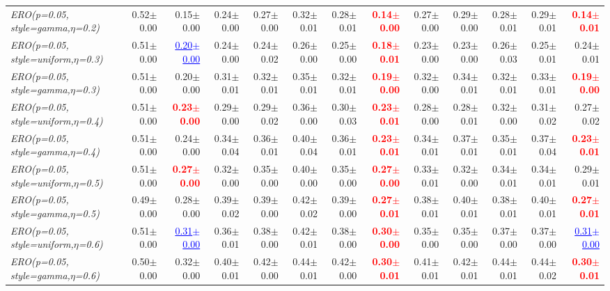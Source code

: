 \documentclass[nohyperref]{article}
\theoremstyle{plain}
\theoremstyle{definition}
\theoremstyle{remark}
\newcommand{\red}[1]{\textcolor{red}{\textbf{#1}}}
\newcommand{\blue}[1]{\textcolor{blue}{\underline{#1}}}
\begin{document}
\begin{table*}[!ht]
{\begin{tabular}{lrr|rrrrr|rrrrr}
			{\it ERO(p=0.05, style=gamma,$\eta$=0.2)} & 0.52$\pm$0.00 & 0.15$\pm$0.00 & 0.24$\pm$0.00 & 0.27$\pm$0.00 & 0.32$\pm$0.01 & 0.28$\pm$0.01 & \red{0.14$\pm$0.00} & 0.27$\pm$0.00 & 0.29$\pm$0.00 & 0.28$\pm$0.01 & 0.29$\pm$0.01 & \red{0.14$\pm$0.01} \\
			{\it ERO(p=0.05, style=uniform,$\eta$=0.3)} & 0.51$\pm$0.00 & \blue{0.20$\pm$0.00} & 0.24$\pm$0.00 & 0.24$\pm$0.02 & 0.26$\pm$0.00 & 0.25$\pm$0.00 & \red{0.18$\pm$0.01} & 0.23$\pm$0.00 & 0.23$\pm$0.00 & 0.26$\pm$0.03 & 0.25$\pm$0.01 & 0.24$\pm$0.01 \\
			{\it ERO(p=0.05, style=gamma,$\eta$=0.3)} & 0.51$\pm$0.00 & 0.20$\pm$0.00 & 0.31$\pm$0.01 & 0.32$\pm$0.01 & 0.35$\pm$0.01 & 0.32$\pm$0.01 & \red{0.19$\pm$0.00} & 0.32$\pm$0.00 & 0.34$\pm$0.01 & 0.32$\pm$0.01 & 0.33$\pm$0.01 & \red{0.19$\pm$0.00} \\
			{\it ERO(p=0.05, style=uniform,$\eta$=0.4)} & 0.51$\pm$0.00 & \red{0.23$\pm$0.00} & 0.29$\pm$0.00 & 0.29$\pm$0.02 & 0.36$\pm$0.00 & 0.30$\pm$0.03 & \red{0.23$\pm$0.01} & 0.28$\pm$0.00 & 0.28$\pm$0.01 & 0.32$\pm$0.00 & 0.31$\pm$0.02 & 0.27$\pm$0.02 \\
			{\it ERO(p=0.05, style=gamma,$\eta$=0.4)} & 0.51$\pm$0.00 & 0.24$\pm$0.00 & 0.34$\pm$0.04 & 0.36$\pm$0.01 & 0.40$\pm$0.04 & 0.36$\pm$0.01 & \red{0.23$\pm$0.01} & 0.34$\pm$0.01 & 0.37$\pm$0.01 & 0.35$\pm$0.01 & 0.37$\pm$0.04 & \red{0.23$\pm$0.01} \\
			{\it ERO(p=0.05, style=uniform,$\eta$=0.5)} & 0.51$\pm$0.00 & \red{0.27$\pm$0.00} & 0.32$\pm$0.00 & 0.35$\pm$0.00 & 0.40$\pm$0.00 & 0.35$\pm$0.00 & \red{0.27$\pm$0.00} & 0.33$\pm$0.01 & 0.32$\pm$0.00 & 0.34$\pm$0.01 & 0.34$\pm$0.01 & 0.29$\pm$0.01 \\
			{\it ERO(p=0.05, style=gamma,$\eta$=0.5)} & 0.49$\pm$0.00 & 0.28$\pm$0.00 & 0.39$\pm$0.02 & 0.39$\pm$0.00 & 0.42$\pm$0.02 & 0.39$\pm$0.00 & \red{0.27$\pm$0.01} & 0.38$\pm$0.01 & 0.40$\pm$0.01 & 0.38$\pm$0.01 & 0.40$\pm$0.01 & \red{0.27$\pm$0.01} \\
			{\it ERO(p=0.05, style=uniform,$\eta$=0.6)} & 0.51$\pm$0.00 & \blue{0.31$\pm$0.00} & 0.36$\pm$0.01 & 0.38$\pm$0.00 & 0.42$\pm$0.01 & 0.38$\pm$0.00 & \red{0.30$\pm$0.00} & 0.35$\pm$0.00 & 0.35$\pm$0.00 & 0.37$\pm$0.00 & 0.37$\pm$0.00 & \blue{0.31$\pm$0.00} \\
			{\it ERO(p=0.05, style=gamma,$\eta$=0.6)} & 0.50$\pm$0.00 & 0.32$\pm$0.00 & 0.40$\pm$0.01 & 0.42$\pm$0.00 & 0.44$\pm$0.01 & 0.42$\pm$0.00 & \red{0.30$\pm$0.01} & 0.41$\pm$0.01 & 0.42$\pm$0.01 & 0.44$\pm$0.01 & 0.44$\pm$0.02 & \red{0.30$\pm$0.01} \\

\end{tabular}}
\end{table*}
\end{document}
